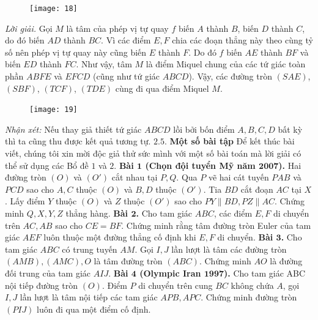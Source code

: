 \begin{multicols}{2}
	\begin{figure}[H]
		\vspace*{-5pt}
		\centering
		\captionsetup{labelformat= empty, justification=centering}
		\texttt{[image: 18]}
		\vspace*{-10pt}
	\end{figure}
	\textit{Lời giải.} Gọi $M$ là tâm của phép vị tự quay $f$ biến $A$ thành $B$, biến $D$ thành $C$, do đó biến $AD$ thành $BC$. Vì các điểm $E,F$ chia các đoạn thẳng này theo cùng tỷ số nên phép vị tự quay này cũng biến $E$ thành $F$. Do đó $f$ biến $AE$ thành $BF$ và biến $ED$ thành $FC$. Như vậy, tâm $M$ là điểm Miquel chung của các tứ giác toàn phần $ABFE$ và $EFCD$ (cũng như tứ giác $ABCD$). Vậy, các đường tròn $(SAE)$, $(SBF)$, $(TCF)$, $(TDE)$ cùng đi qua điểm Miquel $M$.
	\begin{figure}[H]
		\centering
		\captionsetup{labelformat= empty, justification=centering}
		\texttt{[image: 19]}
		\vspace*{-10pt}
	\end{figure}
	\textit{Nhận xét:} Nếu thay giả thiết tứ giác $ABCD$ lồi bởi bốn điểm $A,B,C,D$ bất kỳ thì ta cũng thu được kết quả tương tự.
	\vskip 0.1cm
	$\pmb{2.5.}$ \textbf{\color{diendantoanhoc}Một số bài tập}
	\vskip 0.1cm
	Để kết thúc bài viết, chúng tôi xin mời độc giả thử sức mình với một số bài toán mà lời giải có thể sử dụng các Bổ đề $1$ và $2$.
	\vskip 0.1cm
	\textbf{\color{diendantoanhoc}Bài $\pmb{1}$ (Chọn đội tuyển Mỹ năm $\pmb{2007}$).} Hai đường tròn $(O)$ và $(O')$ cắt nhau tại $P,Q$.  Qua $P$ vẽ hai cát tuyến $PAB$ và $PCD$ sao cho $A,C$ thuộc $(O)$ và $B,D$ thuộc $(O')$. Tia $BD$ cắt đoạn $AC$ tại $X$. Lấy điểm $Y$ thuộc $(O)$ và $Z$ thuộc $(O')$ sao cho $PY\parallel BD,PZ\parallel AC$. Chứng minh $Q,X,Y,Z$ thẳng hàng.
	\vskip 0.1cm
	\textbf{\color{diendantoanhoc}Bài $\pmb{2}$.} Cho tam giác $ABC$, các điểm $E,F$ di chuyển trên $AC,AB$ sao cho $CE=BF$. Chứng minh rằng tâm đường tròn Euler của tam giác $AEF$ luôn thuộc một đường thẳng cố định khi $E,F$ di chuyển.
	\vskip 0.1cm
	\textbf{\color{diendantoanhoc}Bài $\pmb{3}$.} Cho tam giác $ABC$ có trung tuyến $AM$. Gọi $I,J$ lần lượt là tâm các đường tròn $(AMB),(AMC),O$ là tâm đường tròn $(ABC)$. Chứng minh $AO$ là đường đối trung của tam giác $AIJ$.
	\vskip 0.1cm
	\textbf{\color{diendantoanhoc}Bài $\pmb{4}$ (Olympic Iran $\pmb{1997}$).} Cho tam giác ABC nội tiếp đường tròn $(O)$. Điểm $P$ di chuyển trên cung $BC$ không chứa $A$, gọi $I,J$ lần lượt là tâm nội tiếp các tam giác $APB,APC$. Chứng minh đường tròn $(PIJ)$ luôn đi qua một điểm cố định.

\end{multicols}

